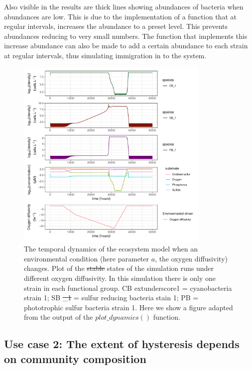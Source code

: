 \documentclass[]{elsarticle} %
\providecommand{\DIFaddtex}[1]{{\protect\color{blue}\uwave{#1}}} %
\providecommand{\DIFdeltex}[1]{{\protect\color{red}\sout{#1}}}                      %
\providecommand{\DIFaddFL}[1]{\DIFadd{#1}} %
\providecommand{\DIFdelFL}[1]{\DIFdel{#1}} %
\providecommand{\DIFaddbeginFL}{} %
\providecommand{\DIFaddendFL}{} %
\providecommand{\DIFdelbeginFL}{} %
\providecommand{\DIFdelendFL}{} %
\providecommand{\DIFadd}[1]{\texorpdfstring{\DIFaddtex{#1}}{#1}} %
\providecommand{\DIFdel}[1]{\texorpdfstring{\DIFdeltex{#1}}{}} %
\newcommand{\DIFscaledelfig}{0.5}
\newlength{\DIFdelgraphicswidth} %
\newlength{\DIFdelgraphicsheight} %
\newcommand{\DIFaddincludegraphics}[2][]{{\color{blue}\fbox{\DIFOincludegraphics[#1]{#2}}}} %
\newcommand{\DIFdelincludegraphics}[2][]{%
\sbox{\DIFdelgraphicsbox}{\DIFOincludegraphics[#1]{#2}}%
\settoboxwidth{\DIFdelgraphicswidth}{\DIFdelgraphicsbox} %
\settoboxtotalheight{\DIFdelgraphicsheight}{\DIFdelgraphicsbox} %
\scalebox{\DIFscaledelfig}{%
\parbox[b]{\DIFdelgraphicswidth}{\usebox{\DIFdelgraphicsbox}\\[-\baselineskip] \rule{\DIFdelgraphicswidth}{0em}}\llap{\resizebox{\DIFdelgraphicswidth}{\DIFdelgraphicsheight}{%
\setlength{\unitlength}{\DIFdelgraphicswidth}%
\begin{picture}(1,1)%
\thicklines\linethickness{2pt} %
{\color[rgb]{1,0,0}\put(0,0){\framebox(1,1){}}}%
{\color[rgb]{1,0,0}\put(0,0){\line( 1,1){1}}}%
{\color[rgb]{1,0,0}\put(0,1){\line(1,-1){1}}}%
\end{picture}%
}\hspace*{3pt}}} %
} %
\DeclareRobustCommand{\DIFaddbeginFL}{\DIFOaddbeginFL \let\includegraphics\DIFaddincludegraphics} %
\DeclareRobustCommand{\DIFaddendFL}{\DIFOaddendFL \let\includegraphics\DIFOincludegraphics} %
\DeclareRobustCommand{\DIFdelbeginFL}{\DIFOdelbeginFL \let\includegraphics\DIFdelincludegraphics} %
\DeclareRobustCommand{\DIFdelendFL}{\DIFOaddendFL \let\includegraphics\DIFOincludegraphics} %
\begin{document}
Also visible in the results are thick lines showing abundances of bacteria when abundances are low. This is due to the implementation of a function that at regular intervals, increases the abundance to a preset level. This prevents abundances reducing to very small numbers. The function that implements this increase abundance can also be made to add a certain abundance to each strain at regular intervals, thus simulating immigration in to the system.

\begin{figure}

{\centering \includegraphics[width=350px]{figures/gen_uc1_partrep_temporal_state_switching} 

}

\caption{The temporal dynamics of the ecosystem model when an environmental condition (here parameter $a$, the oxygen diffusivity) changes. Plot of the \DIFdelbeginFL \DIFdelFL{stable }\DIFdelendFL \DIFaddbeginFL \DIFaddFL{final }\DIFaddendFL states of the simulation runs under different oxygen diffusivity. In this simulation there is only one strain in each functional group. CB    extunderscore1 = cyanobacteria strain 1; SB \DIFdelbeginFL \DIFdelFL{\_1 }\DIFdelendFL \DIFaddbeginFL \DIFaddFL{extunderscore1 }\DIFaddendFL = sulfur reducing bacteria stain 1; PB = phototrophic sulfur bacteria strain 1. Here we show a figure adapted from the output of the $plot\_dynamics()$  function.}\label{fig:uc1}
\end{figure}

\hypertarget{use-case-2-the-extent-of-hysteresis-depends-on-community-composition}{%
\subsection{Use case 2: The extent of hysteresis depends on community composition}\label{use-case-2-the-extent-of-hysteresis-depends-on-community-composition}}
\end{document}
